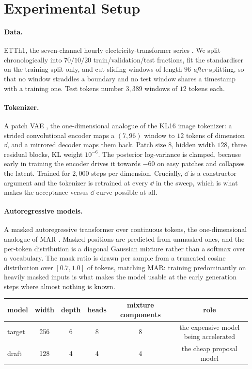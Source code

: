 \section{Experimental Setup}
\label{app:setup}

\paragraph{Data.} ETTh1, the seven-channel hourly electricity-transformer series
\citep{zhou2021informer}. We split chronologically into $70/10/20$ train/validation/test fractions,
fit the standardiser on the training split only, and cut sliding windows of length $96$ \emph{after}
splitting, so that no window straddles a boundary and no test window shares a timestamp with a
training one. Test tokens number $3{,}389$ windows of $12$ tokens each.

\paragraph{Tokenizer.} A patch VAE \citep{kingma2014auto}, the one-dimensional analogue of the KL16
image tokenizer: a strided convolutional encoder maps a $(7, 96)$ window to $12$ tokens of dimension
$\dd$, and a mirrored decoder maps them back. Patch size $8$, hidden width $128$, three residual
blocks, KL weight $10^{-6}$. The posterior log-variance is clamped, because early in training the
encoder drives it towards $-60$ on easy patches and collapses the latent. Trained for $2{,}000$ steps
per dimension. Crucially, $\dd$ is a constructor argument and the tokenizer is retrained at every
$\dd$ in the sweep, which is what makes the acceptance-versus-$\dd$ curve possible at all.

\paragraph{Autoregressive models.} A masked autoregressive transformer over continuous tokens, the
one-dimensional analogue of MAR \citep{li2024autoregressive}. Masked positions are predicted from
unmasked ones, and the per-token distribution is a diagonal Gaussian mixture rather than a softmax
over a vocabulary. The mask ratio is drawn per sample from a truncated cosine distribution over
$[0.7, 1.0]$ of tokens, matching MAR: training predominantly on heavily masked inputs is what makes
the model usable at the early generation steps where almost nothing is known.

\begin{center}
\small
\begin{tabular}{lccccc}
\toprule
model & width & depth & heads & mixture components & role \\
\midrule
target & 256 & 6 & 8 & 8 & the expensive model being accelerated \\
draft  & 128 & 4 & 4 & 4 & the cheap proposal model \\
\bottomrule
\end{tabular}
\end{center}

